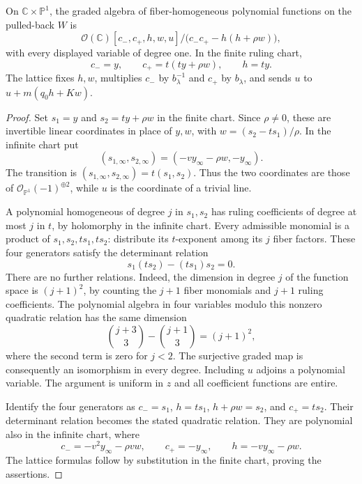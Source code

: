 \begin{lemma}\label{lem:elliptic-extension-fiber-ring}
On $\mathbb C\times\mathbb P^1$, the graded algebra of fiber-homogeneous polynomial functions on the pulled-back $W$ is
\[
 \mathcal O(\mathbb C)
 [c_-,c_+,h,w,u]/\bigl(c_-c_+-h(h+\rho w)\bigr),
\]
with every displayed variable of degree one. In the finite ruling chart,
\[
 c_-=y,\qquad c_+=t(ty+\rho w),\qquad h=ty.
\]
The lattice fixes $h,w$, multiplies $c_-$ by $b_\lambda^{-1}$ and $c_+$ by $b_\lambda$, and sends $u$ to $u+m(q_0h+Kw)$.
\end{lemma}
\begin{proof}
Set $s_1=y$ and $s_2=ty+\rho w$ in the finite chart. Since $\rho\ne0$, these are invertible linear coordinates in place of $y,w$, with $w=(s_2-ts_1)/\rho$. In the infinite chart put
\[
 (s_{1,\infty},s_{2,\infty})
       =(-v y_\infty-\rho w,-y_\infty).
\]
The transition is $(s_{1,\infty},s_{2,\infty})=t(s_1,s_2)$. Thus the two coordinates are those of $\mathcal O_{\mathbb P^1}(-1)^{\oplus2}$, while $u$ is the coordinate of a trivial line.

A polynomial homogeneous of degree $j$ in $s_1,s_2$ has ruling coefficients of degree at most $j$ in $t$, by holomorphy in the infinite chart. Every admissible monomial is a product of $s_1,s_2,ts_1,ts_2$: distribute its $t$-exponent among its $j$ fiber factors. These four generators satisfy the determinant relation
\[
 s_1(ts_2)-(ts_1)s_2=0.
\]
There are no further relations. Indeed, the dimension in degree $j$ of the function space is $(j+1)^2$, by counting the $j+1$ fiber monomials and $j+1$ ruling coefficients. The polynomial algebra in four variables modulo this nonzero quadratic relation has the same dimension
\[
 \binom{j+3}{3}-\binom{j+1}{3}=(j+1)^2,
\]
where the second term is zero for $j<2$. The surjective graded map is consequently an isomorphism in every degree. Including $u$ adjoins a polynomial variable. The argument is uniform in $z$ and all coefficient functions are entire.

Identify the four generators as $c_-=s_1$, $h=ts_1$, $h+\rho w=s_2$, and $c_+=ts_2$. Their determinant relation becomes the stated quadratic relation. They are polynomial also in the infinite chart, where
\[
 c_-=-v^2y_\infty-\rho v w,\qquad
 c_+=-y_\infty,\qquad h=-v y_\infty-\rho w.
\]
The lattice formulas follow by substitution in the finite chart, proving the assertions.
\end{proof}

